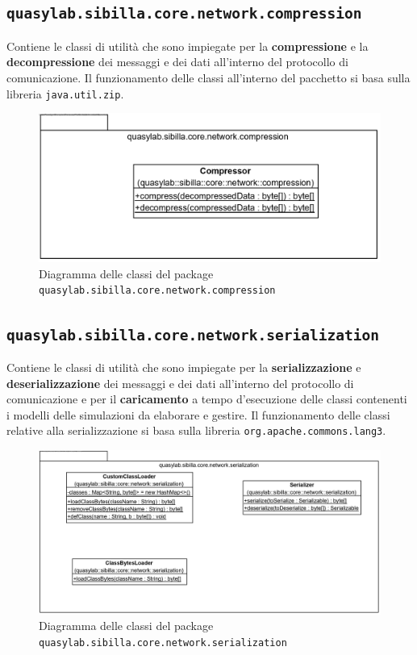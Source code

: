 \subsection{\texttt{quasylab.sibilla.core.network.compression}} Contiene le classi di utilità che sono impiegate per la \textbf{compressione} e la \textbf{decompressione} dei messaggi e dei dati all’interno del protocollo di comunicazione. Il funzionamento delle classi all’interno del pacchetto si basa sulla libreria \texttt{java.util.zip}.

\begin{figure}[H]
    \includegraphics[width=\linewidth]{images/quasylab.sibilla.core.network.compression.png}
    \captionsetup{justification=centering}
    \caption{Diagramma delle classi del package \texttt{quasylab.sibilla.core.network.compression}}
  \end{figure}

\subsection{\texttt{quasylab.sibilla.core.network.serialization}} Contiene le classi di utilità che sono impiegate per la \textbf{serializzazione} e \textbf{deserializzazione} dei messaggi e dei dati all’interno del protocollo di comunicazione e per il \textbf{caricamento} a tempo d’esecuzione delle classi contenenti i modelli delle simulazioni da elaborare e gestire. Il funzionamento delle classi relative alla serializzazione si basa sulla libreria \texttt{org.apache.commons.lang3}.

\begin{figure}[H]
    \includegraphics[width=\linewidth]{images/quasylab.sibilla.core.network.serialization.png}
    \captionsetup{justification=centering}
    \caption{Diagramma delle classi del package \texttt{quasylab.sibilla.core.network.serialization}}
  \end{figure}

